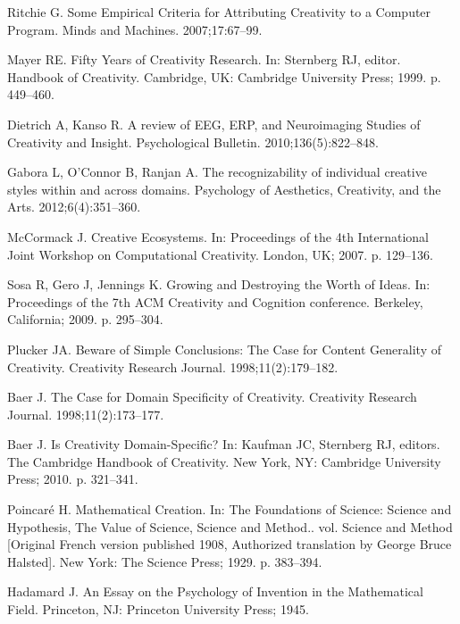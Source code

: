 \documentclass[10pt,letterpaper]{article}
\begin{document}
\begin{thebibliography}{10}
Ritchie G.
\newblock Some Empirical Criteria for Attributing Creativity to a Computer
  Program.
\newblock Minds and Machines. 2007;17:67--99.

Mayer RE.
\newblock Fifty Years of Creativity Research.
\newblock In: Sternberg RJ, editor. Handbook of Creativity. Cambridge, UK:
  Cambridge University Press; 1999. p. 449--460.

Dietrich A, Kanso R.
\newblock A review of {EEG}, {ERP}, and Neuroimaging Studies of Creativity and
  Insight.
\newblock Psychological Bulletin. 2010;136(5):822--848.

Gabora L, O'Connor B, Ranjan A.
\newblock The recognizability of individual creative styles within and across
  domains.
\newblock Psychology of Aesthetics, Creativity, and the Arts.
  2012;6(4):351--360.

McCormack J.
\newblock Creative Ecosystems.
\newblock In: Proceedings of the 4th International Joint Workshop on
  Computational Creativity. London, UK; 2007. p. 129--136.

Sosa R, Gero J, Jennings K.
\newblock Growing and Destroying the Worth of Ideas.
\newblock In: Proceedings of the 7th ACM Creativity and Cognition conference.
  Berkeley, California; 2009. p. 295--304.

Plucker JA.
\newblock Beware of Simple Conclusions: The Case for Content Generality of
  Creativity.
\newblock Creativity Research Journal. 1998;11(2):179--182.

Baer J.
\newblock The Case for Domain Specificity of Creativity.
\newblock Creativity Research Journal. 1998;11(2):173--177.

Baer J.
\newblock Is Creativity Domain-Specific?
\newblock In: Kaufman JC, Sternberg RJ, editors. The Cambridge Handbook of
  Creativity. New York, NY: Cambridge University Press; 2010. p. 321--341.

Poincar\'e H.
\newblock Mathematical Creation.
\newblock In: The Foundations of Science: Science and Hypothesis, The Value of
  Science, Science and Method.. vol. Science and Method [Original French
  version published 1908, Authorized translation by George Bruce Halsted]. New
  York: The Science Press; 1929. p. 383--394.

Hadamard J.
\newblock An Essay on the Psychology of Invention in the Mathematical Field.
\newblock Princeton, NJ: Princeton University Press; 1945.


\end{thebibliography}
\end{document}
